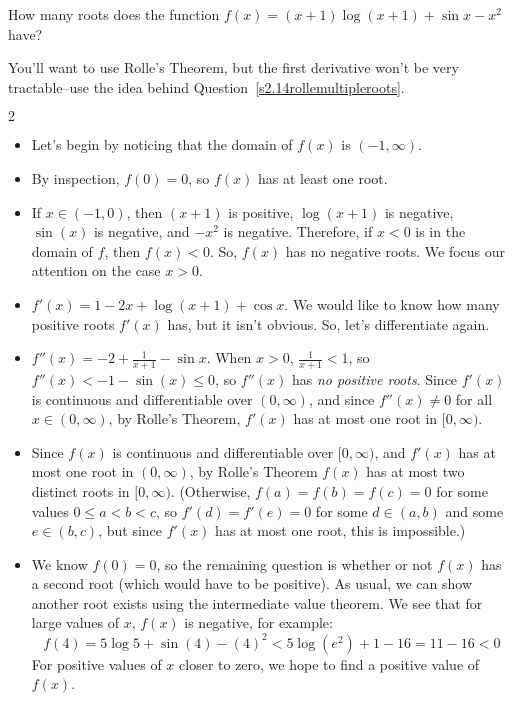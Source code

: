 \begin{question}
How many roots does the function $f(x)=(x+1)\log(x+1)+\sin x - x^2$ have?
\end{question}
\begin{hint}
You'll want to use Rolle's Theorem, but the first derivative won't be very tractable--use  the idea behind Question~\ref{s2.14rollemultipleroots}.
\end{hint}
\begin{answer}
$2$
\end{answer}
\begin{solution}
\begin{itemize}
\item Let's begin by noticing that the domain of $f(x)$ is $(-1,\infty)$.
\item By inspection, $f(0)=0$, so $f(x)$ has at least one root.
\item If $x\in(-1,0)$, then $(x+1)$ is positive, $\log(x+1)$ is negative,  $\sin(x)$ is negative, and $-x^2$ is negative. Therefore, if $x<0$ is in the domain of $f$, then $f(x)<0$. So, $f(x)$ has no negative roots. We focus our attention on the case $x>0$.
\item $f'(x)=1-2x+\log(x+1)+\cos x$.  We would like to know how many positive roots $f'(x)$ has, but it isn't obvious. So, let's differentiate again.
\item $f''(x)=-2+\frac{1}{x+1}-\sin x$. When $x>0$, $\frac{1}{x+1}<1$, so $f''(x) <-1-\sin(x) \leq 0$, so $f''(x)$ has \emph{no positive roots}. Since $f'(x)$ is continuous and differentiable over $(0,\infty)$, and since $f''(x) \neq 0$ for all $x \in (0, \infty)$, by Rolle's Theorem, $f'(x)$ has at most one root in $[0,\infty)$.
\item Since $f(x)$ is continuous and differentiable
over $[0,\infty)$, and $f'(x)$ has at most one root in $(0,\infty)$, by Rolle's Theorem $f(x)$ has at most two distinct roots in $[0,\infty)$.
(Otherwise, $f(a)=f(b)=f(c)=0$ for some values $0\le a<b<c$, so $f'(d)=f'(e)=0$ for some $d\in(a,b)$ and some $e \in (b,c)$, but since $f'(x)$ has at most one root, this is impossible.)
\item We know $f(0)=0$, so the remaining question is whether or not $f(x)$ has a second root (which would have to be positive). As usual, we can show another root exists using the intermediate value theorem. We see that for large values of $x$, $f(x)$ is negative, for example:
\[f(4)=5\log 5+\sin(4)-(4)^2 <  5\log(e^2) + 1 -16 =11-16<0\]
For positive values of $x$ closer to zero, we hope to find a positive value of $f(x)$.

\end{itemize}
\end{solution}
